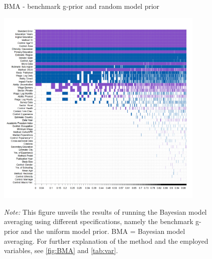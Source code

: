 \begin{figure}[!htbp]
\begin{center}
\caption{BMA - benchmark g-prior and random model prior}
\label{fig:BMA3}
\includegraphics[width=0.9\textwidth]{Figures/bma_BRIC_random_results.png}
\end{center}\vspace{-0.5cm}
\captionsetup{width=0.9\textwidth, font = scriptsize}
\caption*{\emph{Note:} This figure unveils the results of running the Bayesian model averaging using different specifications, namely the benchmark g-prior and the uniform model prior. BMA = Bayesian model averaging. For further explanation of the method and the employed variables, see \autoref{fig:BMA} and \autoref{tab:var}.
}
\end{figure}


